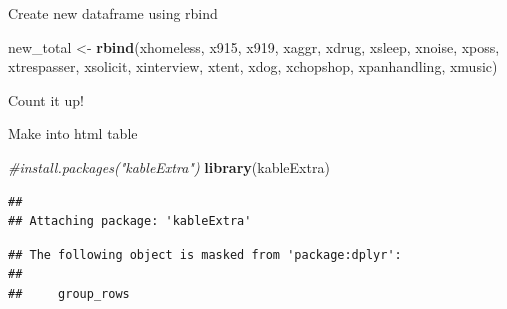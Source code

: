 \documentclass[]{book}
\newenvironment{Shaded}{\begin{snugshade}}{\end{snugshade}}
\newcommand{\CommentTok}[1]{\textcolor[rgb]{0.56,0.35,0.01}{\textit{#1}}}
\newcommand{\DecValTok}[1]{\textcolor[rgb]{0.00,0.00,0.81}{#1}}
\newcommand{\KeywordTok}[1]{\textcolor[rgb]{0.13,0.29,0.53}{\textbf{#1}}}
\newcommand{\NormalTok}[1]{#1}
\newcommand{\OperatorTok}[1]{\textcolor[rgb]{0.81,0.36,0.00}{\textbf{#1}}}
\newcommand{\StringTok}[1]{\textcolor[rgb]{0.31,0.60,0.02}{#1}}
\begin{document}
Create new dataframe using rbind

\begin{Shaded}
\begin{Highlighting}[]
\NormalTok{new_total <-}\StringTok{ }\KeywordTok{rbind}\NormalTok{(xhomeless, x915, x919, xaggr, xdrug, xsleep, xnoise, xposs, xtrespasser, xsolicit, xinterview, xtent, xdog,}
\NormalTok{                   xchopshop, xpanhandling, xmusic)}
\end{Highlighting}
\end{Shaded}

Count it up!

\begin{Shaded}
\end{Shaded}

Make into html table

\begin{Shaded}
\begin{Highlighting}[]
\CommentTok{#install.packages("kableExtra")}
\KeywordTok{library}\NormalTok{(kableExtra)}
\end{Highlighting}
\end{Shaded}

\begin{verbatim}
## 
## Attaching package: 'kableExtra'
\end{verbatim}

\begin{verbatim}
## The following object is masked from 'package:dplyr':
## 
##     group_rows
\end{verbatim}

\begin{Shaded}
\end{Shaded}
\end{document}

